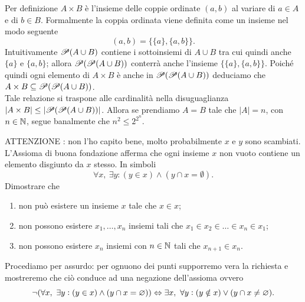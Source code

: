 \documentclass[a4paper]{article}\par \usepackage{style}\par
\begin{document}
Per definizione $ A \times B $ è l'insieme delle coppie ordinate $ (a, b) $ al variare di $ a \in A $ e di $ b \in B $. Formalmente la coppia ordinata viene definita come un insieme nel modo seguente \[(a,b) = \{\{a\}, \{a, b\}\}.\] \textsf{Intuitivamente $ \P(A \cup B) $ contiene i sottoinsiemi di $ A \cup B $ tra cui quindi anche $ \{a\} $ e $ \{a,b\} $; allora $ \P(\P(A \cup B)) $ conterrà anche l'insieme $ \{\{a\}, \{a, b\}\} $. Poiché quindi ogni elemento di $ A \times B $ è anche in $ \P(\P(A \cup B)) $ deduciamo che $ A \times B \subseteq \P(\P(A \cup B)) $.}\\
Tale relazione si traspone alle cardinalità nella disuguaglianza $ |A \times B| \leq |\P(\P(A \cup B))| $. Allora se prendiamo $ A = B $ tale che $ |A| = n $, con $ n \in \N $, segue banalmente che $ n^2 \leq 2^{2^n} $.\par 
\begin{es}
  \textsf{ATTENZIONE : non l'ho capito bene, molto probabilmente $ x $ e $ y $ sono scambiati.} \\
  L'Assioma di buona fondazione afferma che ogni insieme $ x $ non vuoto contiene un elemento disgiunto da $ x $ stesso. In simboli \[\forall x, \ \exists y : (y \in x) \wedge (y \cap x = \emptyset).\] Dimostrare che
  \begin{enumerate}
  \item non può esistere un insieme $ x $ tale che $ x \in x $;
  \item non possono esistere $ x_1, \dots, x_n $ insiemi tali che $ x_1 \in x_2 \in \dots \in x_n \in x_1 $;
  \item non possono esistere $ x_n $ insiemi con $ n \in \N $ tali che $ x_{n+1} \in x_{n} $.
  \end{enumerate}
\end{es}
Procediamo per assurdo: per ognuono dei punti supporremo vera la richiesta e mostreremo che ciò conduce ad una negazione dell'assioma ovvero \[\neg (\forall x, \ \exists y : (y \in x) \wedge (y \cap x = \emptyset)) \iff \exists x, \ \forall y : (y \notin x) \vel (y \cap x \neq \emptyset). \]
\end{document}

